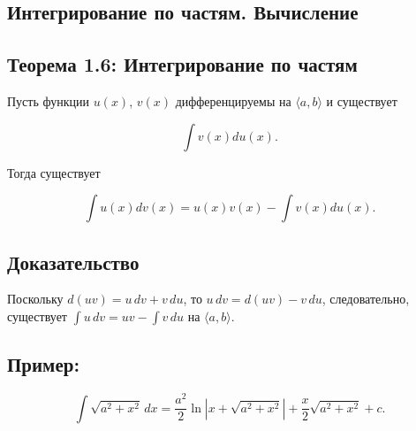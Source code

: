 {
\subsection{Интегрирование по частям. Вычисление}
\subsection*{Теорема 1.6: Интегрирование по частям}

Пусть функции \( u(x) \), \( v(x) \) дифференцируемы на \( \langle a, b \rangle \) и существует 


\[
\int v(x)du(x).
\]


Тогда существует 


\[
\int u(x)dv(x) = u(x)v(x) - \int v(x)du(x).
\]



\subsection*{Доказательство}

Поскольку \( d(uv) = u \, dv + v \, du \), то \( u \, dv = d(uv) - v \, du \), следовательно, существует \( \int u \, dv = uv - \int v \, du \) на \( \langle a, b \rangle \).


\subsection*{Пример:}



\[
\int \sqrt{a^2 + x^2} \,dx = \frac{a^2}{2} \ln |x + \sqrt{a^2 + x^2}| + \frac{x}{2} \sqrt{a^2 + x^2} + c.
\]



}